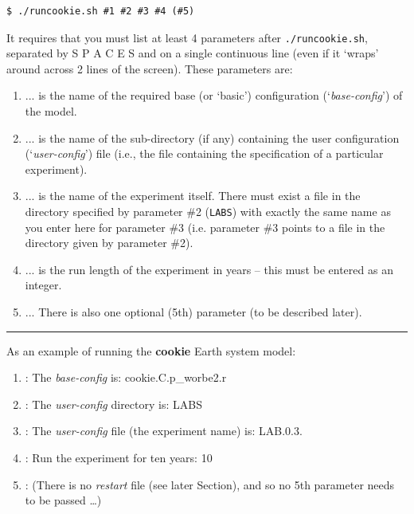 \vspace{-1mm}\begin{verbatim}
$ ./runcookie.sh #1 #2 #3 #4 (#5)
\end{verbatim}\vspace{-1mm}

\noindent It requires that you must list at least 4 parameters after \texttt{./runcookie.sh}, separated by S P A C E S and on a single continuous line (even if it ‘wraps’ around across 2 lines of the screen).
These parameters are:

\vspace{2mm}
\begin{enumerate}[noitemsep]
\setlength{\itemindent}{.2in}
\item[\textbf{\#1}] ... is the name of the required base (or ‘basic’) configuration (‘\textit{base-config}’) of the model.
\item[\textbf{\#2}] ... is the name of the sub-directory (if any) containing the user configuration (‘\textit{user-config}’) file (i.e., the file containing the specification of a particular experiment).
\item[\textbf{\#3}] ... is the name of the experiment itself. There must exist a file in the directory specified by parameter \#2 (\texttt{LABS}) with exactly the same name as you enter here for parameter \#3 (i.e. parameter \#3 points to a file in the directory given by parameter \#2).
\item[\textbf{\#4}] ... is the run length of the experiment in years – this must be entered as an integer.
\item[\textbf{(\#5)}] ... There is also one optional (5th) parameter (to be described later).
\end{enumerate}

\vspace{1mm}\noindent\rule{4cm}{0.5pt}\vspace{2mm}

\noindent As an example of running the \textbf{cookie} Earth system model:

\vspace{2mm}
\begin{enumerate}[noitemsep]
\setlength{\itemindent}{.2in}
\item[\textbf{\#1}]: The \textit{base-config} is: \textsf{\footnotesize cookie.C.p\_worbe2.r}
\item[\textbf{\#2}]: The \textit{user-config} directory is: \textsf{\footnotesize  LABS}
\item[\textbf{\#3}]: The \textit{user-config} file (the experiment name) is: \textsf{\footnotesize LAB.0.3}.
\item[\textbf{\#4}]: Run the experiment for ten years: 10
\item[\textbf{\#5}]: (There is no \textit{restart} file (see later Section), and so no 5th parameter needs to be passed …)
\end{enumerate}

